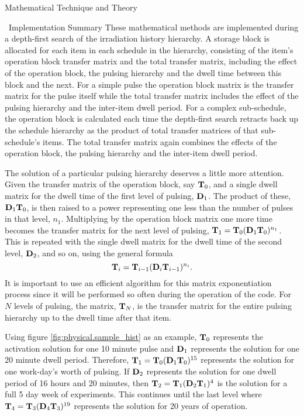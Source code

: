 \begin{chapter}{Mathematical Technique and Theory\label{chap:math}}
\begin{section}{\ALARA\  Implementation Summary}
    These mathematical methods are implemented during a depth-first
    search of the irradiation history hierarchy.  A storage block is
    allocated for each item in each schedule in the hierarchy,
    consisting of the item's operation block transfer matrix and the
    total transfer matrix, including the effect of the operation
    block, the pulsing hierarchy and the dwell time between this block
    and the next.  For a simple pulse the operation block matrix is
    the transfer matrix for the pulse itself while the total transfer
    matrix includes the effect of the pulsing hierarchy and the
    inter-item dwell period.  For a complex sub-schedule, the
    operation block is calculated each time the depth-first search
    retracts back up the schedule hierarchy as the product of total
    transfer matrices of that sub-schedule's items.  The total
    transfer matrix again combines the effects of the operation block,
    the pulsing hierarchy and the inter-item dwell period.
  
    The solution of a particular pulsing hierarchy deserves a little
    more attention.  Given the transfer matrix of the operation block,
    say $\mbox{$\mathbf{T}$}_0$, and a single dwell matrix for the dwell time of
    the first level of pulsing, $\mbox{$\mathbf{D}$}_1$.  The product of these,
    $\mbox{$\mathbf{D}$}_1\mbox{$\mathbf{T}$}_0$, is then raised to a power representing one
    less than the number of pulses in that level, $n_1$.  Multiplying
    by the operation block matrix one more time becomes the transfer
    matrix for the next level of pulsing, $\mbox{$\mathbf{T}$}_1 =
    \mbox{$\mathbf{T}$}_0(\mbox{$\mathbf{D}$}_1\mbox{$\mathbf{T}$}_0)^{n_1}$.  This is repeated with the
    single dwell matrix for the dwell time of the second level,
    $\mbox{$\mathbf{D}$}_2$, and so on, using the general formula\cite{spangler}
    \begin{equation}
      \mbox{$\mathbf{T}$}_i = \mbox{$\mathbf{T}$}_{i-1}(\mbox{$\mathbf{D}$}_{i}\mbox{$\mathbf{T}$}_{i-1})^{n_i}.
      \label{eqn:pulsing.recurse}
    \end{equation}
    It is important to use an efficient algorithm\cite{UofT_csc280}
    for this matrix exponentiation process since it will be performed
    so often during the operation of the code.  For $N$ levels of
    pulsing, the matrix, $\mbox{$\mathbf{T}$}_{N}$, is the transfer matrix for the
    entire pulsing hierarchy up to the dwell time after that item.
    
    Using figure \ref{fig:physical.sample_hist} as an example,
    $\mbox{$\mathbf{T}$}_0$ represents the activation solution for one 10 minute
    pulse and $\mbox{$\mathbf{D}$}_1$ represents the solution for one 20 minute
    dwell period.  Therefore, $\mbox{$\mathbf{T}$}_1 =
    \mbox{$\mathbf{T}$}_0(\mbox{$\mathbf{D}$}_1\mbox{$\mathbf{T}$}_0)^{15}$ represents the solution for
    one work-day's worth of pulsing.  If $\mbox{$\mathbf{D}$}_2$ represents the
    solution for one dwell period of 16 hours and 20 minutes, then
    $\mbox{$\mathbf{T}$}_2 = \mbox{$\mathbf{T}$}_1(\mbox{$\mathbf{D}$}_2\mbox{$\mathbf{T}$}_1)^{4}$ is the solution
    for a full 5 day week of experiments.  This continues until the
    last level where $\mbox{$\mathbf{T}$}_4 = \mbox{$\mathbf{T}$}_3(\mbox{$\mathbf{D}$}_4\mbox{$\mathbf{T}$}_3)^{19}$
    represents the solution for 20 years of operation.
    

\end{section}
\end{chapter}
